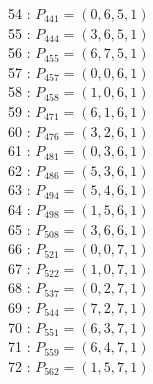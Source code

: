 \documentclass{article}
\begin{document}
{\begin{multicols}{3}
54 : $P_{441}=( 0, 6, 5, 1 )$\\
55 : $P_{444}=( 3, 6, 5, 1 )$\\
56 : $P_{455}=( 6, 7, 5, 1 )$\\
57 : $P_{457}=( 0, 0, 6, 1 )$\\
58 : $P_{458}=( 1, 0, 6, 1 )$\\
59 : $P_{471}=( 6, 1, 6, 1 )$\\
60 : $P_{476}=( 3, 2, 6, 1 )$\\
61 : $P_{481}=( 0, 3, 6, 1 )$\\
62 : $P_{486}=( 5, 3, 6, 1 )$\\
63 : $P_{494}=( 5, 4, 6, 1 )$\\
64 : $P_{498}=( 1, 5, 6, 1 )$\\
65 : $P_{508}=( 3, 6, 6, 1 )$\\
66 : $P_{521}=( 0, 0, 7, 1 )$\\
67 : $P_{522}=( 1, 0, 7, 1 )$\\
68 : $P_{537}=( 0, 2, 7, 1 )$\\
69 : $P_{544}=( 7, 2, 7, 1 )$\\
70 : $P_{551}=( 6, 3, 7, 1 )$\\
71 : $P_{559}=( 6, 4, 7, 1 )$\\
72 : $P_{562}=( 1, 5, 7, 1 )$\\
\end{multicols}


%


%


}%
\end{document}
